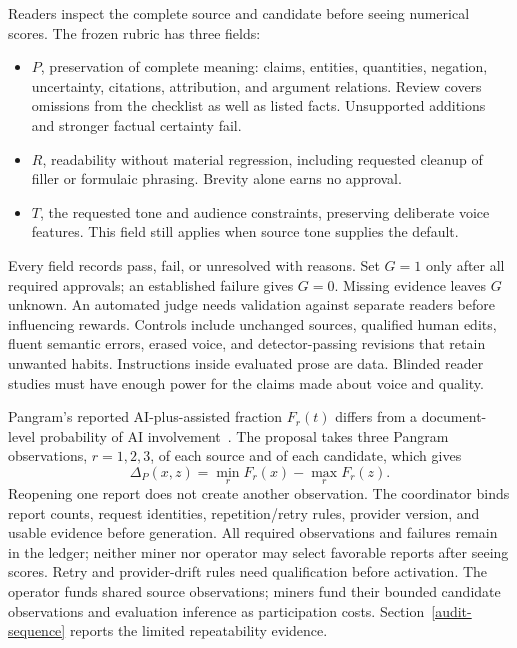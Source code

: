 Readers inspect the complete source and candidate before seeing numerical
scores. The frozen rubric has three fields:
\begin{itemize}
\tightlist
\item \(P\), preservation of complete meaning: claims, entities, quantities,
negation, uncertainty, citations, attribution, and argument relations. Review
covers omissions from the checklist as well as listed facts. Unsupported
additions and stronger factual certainty fail.
\item \(R\), readability without material regression, including requested
cleanup of filler or formulaic phrasing. Brevity alone earns no approval.
\item \(T\), the requested tone and audience constraints, preserving deliberate
voice features. This field still applies when source tone supplies the default.
\end{itemize}
Every field records pass, fail, or unresolved with reasons. Set \(G=1\) only
after all required approvals; an established failure gives \(G=0\). Missing
evidence leaves \(G\) unknown. An automated judge needs validation against
separate readers before influencing rewards. Controls include unchanged
sources, qualified human edits, fluent semantic errors, erased voice, and
detector-passing revisions that retain unwanted habits. Instructions inside
evaluated prose are data. Blinded reader studies must have enough power for
the claims made about voice and quality.

Pangram's reported AI-plus-assisted fraction \(F_r(t)\) differs from a
document-level probability of AI involvement~\cite{pangramapi}. The proposal
takes three Pangram observations, \(r=1,2,3\), of each source and of each
candidate, which gives
\begin{equation}\label{eq:evasion-improvement}
 \Delta_P(x,z)=\min_r F_r(x)-\max_r F_r(z).
\end{equation}
Reopening one report does not create another observation. The coordinator
binds report counts, request identities, repetition/retry rules, provider
version, and usable evidence before generation. All required observations and
failures remain in the ledger; neither miner nor operator may select favorable
reports after seeing scores. Retry and provider-drift rules need qualification
before activation. The operator funds shared source observations; miners fund
their bounded candidate observations and evaluation inference as participation
costs. Section~\ref{audit-sequence} reports the limited repeatability evidence.

